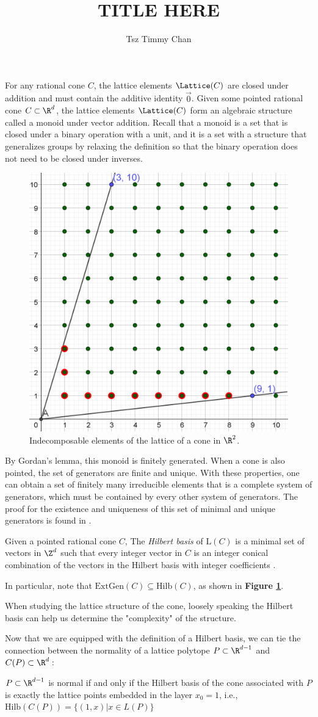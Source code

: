 \documentclass{TC}
\title{TITLE HERE}	%
\author{Tsz Timmy Chan}	%
\begin{document}
For any rational cone $C$, the lattice elements $\Lattice(C)$ are closed under addition and must contain the additive identity $\vec 0$. Given some pointed rational cone $C \subset \R^d$, the lattice elements $\Lattice(C)$ form an algebraic structure called a monoid under vector addition. Recall that a monoid is a set that is closed under a binary operation with a unit, and it is a set with a structure that generalizes groups by relaxing the definition so that the binary operation does not need to be closed under inverses. 

\begin{figure}[h]
\centering
\includegraphics[width=.4\textwidth]{"Hilbert Basis"}
\caption{Indecomposable elements of the lattice of a cone in $\R^2$.}
\label{HilbertBasis}
\end{figure}
 
By Gordan's lemma, this monoid is finitely generated. When a cone is also pointed, the set of generators are finite and unique. With these properties, one can obtain a set of finitely many irreducible elements that is a complete system of generators, which must be contained by every other system of generators. The proof for the existence and uniqueness of this set of minimal and unique generators is found in  \cite{GubeladzePolytopesRingsKtheory, GordanLemma}.



\begin{definition}
Given a pointed rational cone $C$, 
The \emph{Hilbert basis} of $\mathrm{L}(C)$ is a minimal set of vectors in $\Z^d$ such that every integer vector in $C$ is an integer conical combination of the vectors in the Hilbert basis with integer coefficients \cite{HilbertBasis}.
\end{definition}


In particular, note that $\mathrm{ExtGen}(C) \subseteq \mathrm{Hilb}(C)$, as shown in \textbf{Figure \ref{HilbertBasis}}.

When studying the lattice structure of the cone, loosely speaking the Hilbert basis can help us determine the "complexity" of the structure. 

Now that we are equipped with the definition of a Hilbert basis, we can tie the connection between the normality of a lattice polytope $P \subset \R^{d-1}$ and $C(P) \subset \R^{d}:$ 

\begin{remark}
$P\subset \R^{d-1}$ is normal if and only if the Hilbert basis of the cone associated with $P$ is exactly the lattice points embedded in the layer $x_0 = 1$, i.e., $\mathrm{Hilb}(C(P)) = \{(1,x) | x \in L(P)\}$
\end{remark}
\end{document}
